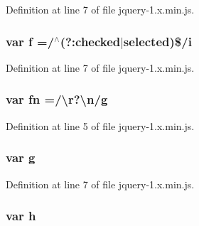 Definition at line 7 of file jquery-\/1.\+x.\+min.\+js.

\subsubsection[{\texorpdfstring{f}{f}}]{\setlength{\rightskip}{0pt plus 5cm}var f =/$^\wedge$(?\+:checked$\vert$selected)\$/{\bf i}}\hypertarget{jquery-1_8x_8min_8js_a9cf09a2972472098a4c689fd988f4dfc}{}\label{jquery-1_8x_8min_8js_a9cf09a2972472098a4c689fd988f4dfc}


Definition at line 7 of file jquery-\/1.\+x.\+min.\+js.

\subsubsection[{\texorpdfstring{fn}{fn}}]{\setlength{\rightskip}{0pt plus 5cm}var fn =/\textbackslash{}r?\textbackslash{}{\bf n}/{\bf g}}\hypertarget{jquery-1_8x_8min_8js_a37b9e1ceee4c6d2616fa6081784b5468}{}\label{jquery-1_8x_8min_8js_a37b9e1ceee4c6d2616fa6081784b5468}


Definition at line 5 of file jquery-\/1.\+x.\+min.\+js.

\subsubsection[{\texorpdfstring{g}{g}}]{\setlength{\rightskip}{0pt plus 5cm}var g}\hypertarget{jquery-1_8x_8min_8js_a103df269476e78897c9c4c6cb8f4eb06}{}\label{jquery-1_8x_8min_8js_a103df269476e78897c9c4c6cb8f4eb06}


Definition at line 7 of file jquery-\/1.\+x.\+min.\+js.

\subsubsection[{\texorpdfstring{h}{h}}]{\setlength{\rightskip}{0pt plus 5cm}var h}\hypertarget{jquery-1_8x_8min_8js_a79fe0eb780a2a4b5543b4dddf8b6188a}{}\label{jquery-1_8x_8min_8js_a79fe0eb780a2a4b5543b4dddf8b6188a}


